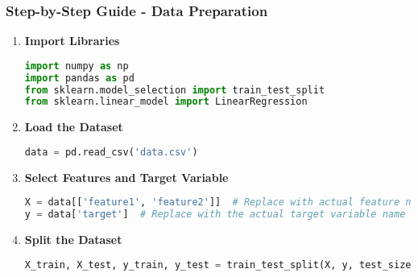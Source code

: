\documentclass[aspectratio=169]{beamer}
\begin{document}
\begin{frame}[fragile]
    \frametitle{Step-by-Step Guide - Data Preparation}
    \begin{enumerate}
        \item \textbf{Import Libraries}
        \begin{lstlisting}[language=Python]
import numpy as np
import pandas as pd
from sklearn.model_selection import train_test_split
from sklearn.linear_model import LinearRegression
        \end{lstlisting}

        \item \textbf{Load the Dataset}
        \begin{lstlisting}[language=Python]
data = pd.read_csv('data.csv')
        \end{lstlisting}
        
        \item \textbf{Select Features and Target Variable}
        \begin{lstlisting}[language=Python]
X = data[['feature1', 'feature2']]  # Replace with actual feature names
y = data['target']  # Replace with the actual target variable name
        \end{lstlisting}

        \item \textbf{Split the Dataset}
        \begin{lstlisting}[language=Python]
X_train, X_test, y_train, y_test = train_test_split(X, y, test_size=0.2, random_state=42)
        \end{lstlisting}
    \end{enumerate}
\end{frame}
\end{document}
